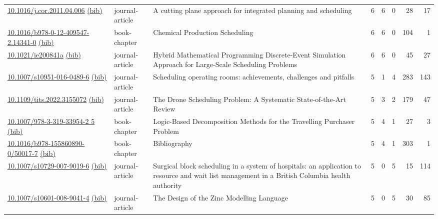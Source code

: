{\begin{longtable}{p{5cm}lp{11cm}rrrrr}
\href{http://dx.doi.org/10.1016/j.cor.2011.04.006}{10.1016/j.cor.2011.04.006} \href{https://www.doi2bib.org/bib/10.1016/j.cor.2011.04.006}{(bib)} & journal-article & A cutting plane approach for integrated planning and scheduling & 6 & 6 & 0 & 28 & 17 \\
\href{http://dx.doi.org/10.1016/b978-0-12-409547-2.14341-0}{10.1016/b978-0-12-409547-2.14341-0} \href{https://www.doi2bib.org/bib/10.1016/b978-0-12-409547-2.14341-0}{(bib)} & book-chapter & Chemical Production Scheduling & 6 & 6 & 0 & 104 & 1 \\
\href{http://dx.doi.org/10.1021/ie200841a}{10.1021/ie200841a} \href{https://www.doi2bib.org/bib/10.1021/ie200841a}{(bib)} & journal-article & Hybrid Mathematical Programming Discrete-Event Simulation Approach for Large-Scale Scheduling Problems & 6 & 6 & 0 & 45 & 27 \\
\href{http://dx.doi.org/10.1007/s10951-016-0489-6}{10.1007/s10951-016-0489-6} \href{https://www.doi2bib.org/bib/10.1007/s10951-016-0489-6}{(bib)} & journal-article & Scheduling operating rooms: achievements, challenges and pitfalls & 5 & 1 & 4 & 283 & 143 \\
\href{http://dx.doi.org/10.1109/tits.2022.3155072}{10.1109/tits.2022.3155072} \href{https://www.doi2bib.org/bib/10.1109/tits.2022.3155072}{(bib)} & journal-article & The Drone Scheduling Problem: A Systematic State-of-the-Art Review & 5 & 3 & 2 & 179 & 47 \\
\href{http://dx.doi.org/10.1007/978-3-319-33954-2_5}{10.1007/978-3-319-33954-2 5} \href{https://www.doi2bib.org/bib/10.1007/978-3-319-33954-2_5}{(bib)} & book-chapter & Logic-Based Decomposition Methods for the Travelling Purchaser Problem & 5 & 4 & 1 & 27 & 3 \\
\href{http://dx.doi.org/10.1016/b978-155860890-0/50017-7}{10.1016/b978-155860890-0/50017-7} \href{https://www.doi2bib.org/bib/10.1016/b978-155860890-0/50017-7}{(bib)} & book-chapter & Bibliography & 5 & 4 & 1 & 303 & 1 \\
\href{http://dx.doi.org/10.1007/s10729-007-9019-6}{10.1007/s10729-007-9019-6} \href{https://www.doi2bib.org/bib/10.1007/s10729-007-9019-6}{(bib)} & journal-article & Surgical block scheduling in a system of hospitals: an application to resource and wait list management in a British Columbia health authority & 5 & 0 & 5 & 15 & 114 \\
\href{http://dx.doi.org/10.1007/s10601-008-9041-4}{10.1007/s10601-008-9041-4} \href{https://www.doi2bib.org/bib/10.1007/s10601-008-9041-4}{(bib)} & journal-article & The Design of the Zinc Modelling Language & 5 & 0 & 5 & 30 & 85 \\

\end{longtable}}
